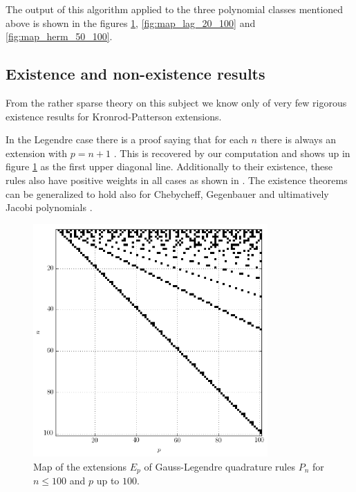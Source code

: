 \documentclass[a4paper,10pt]{article}
\begin{document}
The output of this algorithm applied to the three polynomial classes mentioned
above is shown in the figures \ref{fig:map_leg_100_100}, \ref{fig:map_lag_20_100}
and \ref{fig:map_herm_50_100}.




\subsection{Existence and non-existence results}

From the rather sparse theory on this subject we know only of very few rigorous
existence results for Kronrod-Patterson extensions.

In the Legendre case there is a proof saying that for each $n$ there is
always an extension with $p = n + 1$ \cite{szegoe}. This is recovered by our
computation and shows up in figure \ref{fig:map_leg_100_100} as the first upper
diagonal line. Additionally to their existence, these rules also have positive
weights in all cases as shown in \cite{monegato1978}. The existence theorems can
be generalized to hold also for Chebycheff, Gegenbauer and ultimatively Jacobi
polynomials \cite{gautschi-notaris, gautschi, notaris1990, monegato1978_2}.

\begin{figure}
  \centering
  \includegraphics[width=0.8\textwidth]{./img/map_leg_100_100.png}
  \caption{Map of the extensions $E_p$ of Gauss-Legendre quadrature rules
           $P_n$ for $n \leq 100$ and $p$ up to $100$.}
  \label{fig:map_leg_100_100}
\end{figure}
\end{document}
